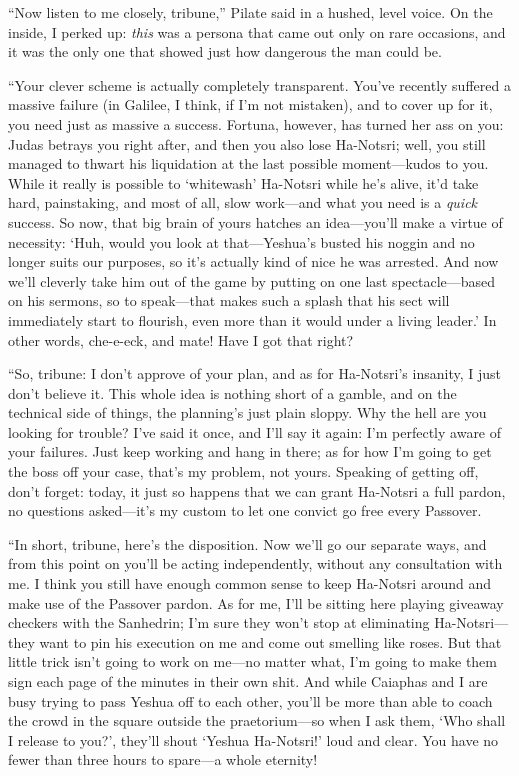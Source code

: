 ``Now listen to me closely, tribune,'' Pilate said in a hushed, level voice. On the inside, I perked up: \emph{this} was a persona that came out only on rare occasions, and it was the only one that showed just how dangerous the man could be.

``Your clever scheme is actually completely transparent. You've recently suffered a massive failure (in Galilee, I think, if I'm not mistaken), and to cover up for it, you need just as massive a success. Fortuna, however, has turned her ass on you: Judas betrays you right after, and then you also lose Ha-Notsri; well, you still managed to thwart his liquidation at the last possible moment---kudos to you. While it really is possible to `whitewash' Ha-Notsri while he's alive, it'd take hard, painstaking, and most of all, slow work---and what you need is a \emph{quick} success. So now, that big brain of yours hatches an idea---you'll make a virtue of necessity: `Huh, would you look at that---Yeshua's busted his noggin and no longer suits our purposes, so it's actually kind of nice he was arrested. And now we'll cleverly take him out of the game by putting on one last spectacle---based on his sermons, so to speak---that makes such a splash that his sect will immediately start to flourish, even more than it would under a living leader.' In other words, che-e-eck, and mate! Have I got that right?

``So, tribune: I don't approve of your plan, and as for Ha-Notsri's insanity, I just don't believe it. This whole idea is nothing short of a gamble, and on the technical side of things, the planning's just plain sloppy. Why the hell are you looking for trouble? I've said it once, and I'll say it again: I'm perfectly aware of your failures. Just keep working and hang in there; as for how I'm going to get the boss off your case, that's my problem, not yours. Speaking of getting off, don't forget: today, it just so happens that we can grant Ha-Notsri a full pardon, no questions asked---it's my custom to let one convict go free every Passover.

``In short, tribune, here's the disposition. Now we'll go our separate ways, and from this point on you'll be acting independently, without any consultation with me. I think you still have enough common sense to keep Ha-Notsri around and make use of the Passover pardon. As for me, I'll be sitting here playing giveaway checkers with the Sanhedrin; I'm sure they won't stop at eliminating Ha-Notsri---they want to pin his execution on me and come out smelling like roses. But that little trick isn't going to work on me---no matter what, I'm going to make them sign each page of the minutes in their own shit. And while Caiaphas and I are busy trying to pass Yeshua off to each other, you'll be more than able to coach the crowd in the square outside the praetorium---so when I ask them, `Who shall I release to you?', they'll shout `Yeshua Ha-Notsri!' loud and clear. You have no fewer than three hours to spare---a whole eternity!

